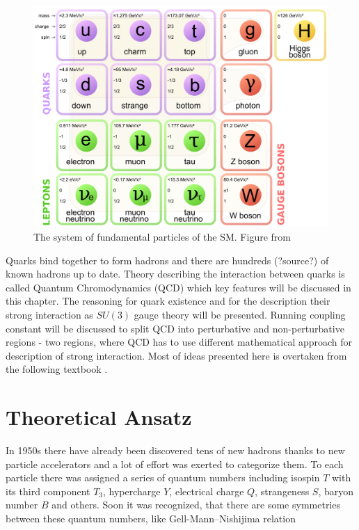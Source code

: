 \documentclass[a4paper,11pt]{report}
\begin{document}
\begin{figure}[!ht]
  \centering
  \includegraphics[width=\textwidth]{Chapter1/SM.png} 
  \caption{The system of fundamental particles of the SM. Figure from
    \cite{wiki:SMParticlesSource}}
  \label{fig:SMparticles}
\end{figure}

Quarks bind together to form hadrons and there are hundreds (?source?) of known
hadrons up to date. Theory describing the interaction between quarks is called
Quantum Chromodynamics (QCD) which key features will be discussed in this
chapter. The reasoning for quark existence and for the description their strong
interaction as $SU(3)$ gauge theory will be presented. Running coupling constant
will be discussed to split QCD into perturbative and non-perturbative regions -
two regions, where QCD has to use different mathematical approach for description of
strong interaction. Most of ideas presented here is overtaken from the following
textbook \cite{QCDTextbook}.

\section{Theoretical Ansatz}

In 1950s there have already been discovered tens of new hadrons thanks to new
particle accelerators and a lot of effort was exerted to categorize them. To each
particle there was assigned a series of quantum numbers
including isospin $T$ with its third component $T_3$, hypercharge $Y$,
electrical charge $Q$, strangeness $S$, baryon number $B$ and others. Soon it
was recognized, that there are some symmetries between these quantum numbers,
like Gell-Mann--Nishijima relation \cite{GellMannNishijima1,GellMannNishijima2}
\end{document}

